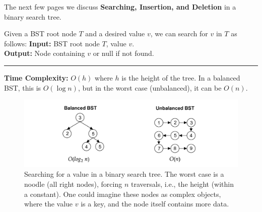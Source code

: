 \noindent
The next few pages we discuss \textbf{Searching, Insertion, and Deletion} in a binary search tree.
  
\newpage
\begin{Func}

    \label{def:bst_search}

    Given a BST root node $T$ and a desired value $v$, we can search for $v$ in $T$ as follows:
  \newpage 
    \vspace{.5em}
    \noindent
    \textbf{Input:} BST root node $T$, value $v$.\\
    \textbf{Output:} Node containing $v$ or null if not found.
    
    \begin{algorithm}[H]
        \SetAlgoLined
    \end{algorithm}
    \noindent
    \rule{\textwidth}{0.4pt}
    \textbf{Time Complexity:} $O(h)$ where $h$ is the height of the tree. In a balanced BST, this is $O(\log n)$, but in the worst case (unbalanced), it can be $O(n)$.
\end{Func}

\begin{figure}[ht!]
    \begin{center}
    \includegraphics[width=\textwidth]{./Sections/graphs/search/bst_search.png}
    \end{center}
     \caption{Searching for a value in a binary search tree. The worst case is a noodle (all right nodes), forcing $n$ traversals, i.e., the height (within a constant). One could imagine these nodes as complex objects, where the value $v$ is a key, and the node itself contains more data.}\label{fig:bst_search}
  \end{figure}

